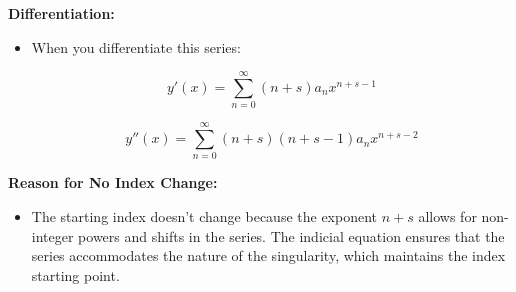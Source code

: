 \textbf{Differentiation:}
\begin{itemize}
    \item When you differentiate this series:
    

\[
    y'(x) = \sum_{n=0}^{\infty} (n+s) a_n x^{n+s-1}
    \]


    

\[
    y''(x) = \sum_{n=0}^{\infty} (n+s)(n+s-1) a_n x^{n+s-2}
    \]


\end{itemize}

\textbf{Reason for No Index Change:}
\begin{itemize}
    \item The starting index doesn't change because the exponent \( n+s \) allows for non-integer powers and shifts in the series. The indicial equation ensures that the series accommodates the nature of the singularity, which maintains the index starting point.
\end{itemize}